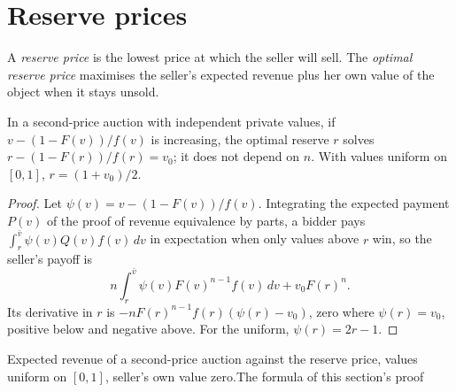\section{Reserve prices}\label{sec:b3:auctions-and-market-design:reserve}

\begin{definition}\label{def:b3:auctions-and-market-design:reserve}
A \emph{reserve price} is the lowest price at which the seller will sell. The
\emph{optimal reserve price} maximises the seller's expected revenue plus her own
value of the object when it stays unsold.
\end{definition}

\begin{proposition}\label{prop:b3:auctions-and-market-design:reserve}
In a second-price auction with independent private values, if $v - (1 - F(v))/f(v)$ is increasing, the
optimal reserve $r$ solves $r - (1 - F(r))/f(r) = v_0$; it does not depend on $n$. With values uniform on $[0, 1]$, $r = (1 + v_0)/2$.
\end{proposition}

\begin{proof}
Let $\psi(v) = v - (1 - F(v))/f(v)$. Integrating the expected payment $P(v)$ of the proof of revenue equivalence by
parts, a bidder pays $\int_r^{\bar v}\psi(v)Q(v)f(v)\,dv$ in expectation when only values above $r$ win, so the seller's payoff is
\[
n\int_r^{\bar v}\psi(v)F(v)^{n-1}f(v)\,dv + v_0 F(r)^n .
\]
Its derivative in $r$ is $-nF(r)^{n-1}f(r)(\psi(r) - v_0)$, zero where $\psi(r) = v_0$, positive below and negative above. For the uniform, $\psi(r) = 2r - 1$.
\end{proof}

\begin{omchart}{Expected revenue of a second-price auction against the reserve
price, values uniform on $[0, 1]$, seller's own value zero.}{The formula of this section's
proof}
\end{omchart}

